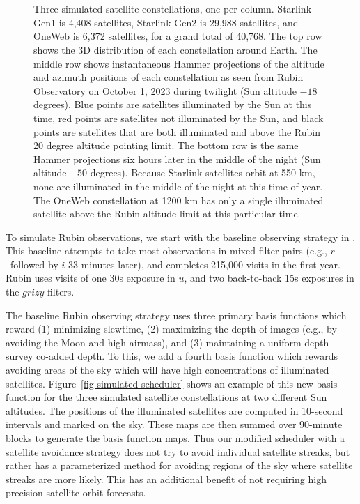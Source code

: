 \documentclass[twocolumn]{aastex631}
\begin{document}
\begin{figure*}[ht!]
\\
\\
\caption{Three simulated satellite constellations, one per column. Starlink Gen1 is 4,408 satellites, Starlink Gen2 is 29,988 satellites, and OneWeb is 6,372 satellites, for a grand total of 40,768. The top row shows the 3D distribution of each constellation around Earth. The middle row shows instantaneous Hammer projections of the altitude and azimuth positions of each constellation as seen from Rubin Observatory on October 1, 2023 during twilight (Sun altitude $-18$ degrees). Blue points are satellites illuminated by the Sun at this time, red points are satellites not illuminated by the Sun, and black points are satellites that are both illuminated and above the Rubin 20 degree altitude pointing limit. The bottom row is the same Hammer projections six hours later in the middle of the night (Sun altitude $-50$ degrees). Because Starlink satellites orbit at 550 km, none are illuminated in the middle of the night at this time of year. The OneWeb constellation at 1200 km has only a single illuminated satellite above the Rubin altitude limit at this particular time.
\vspace{4em}
\label{fig-simulated-constellations}
}
\end{figure*}

To simulate Rubin observations, we start with the baseline observing strategy in \citet{yoachim2022b}. This baseline attempts to take most observations in mixed filter pairs (e.g., $r$\ followed by $i$ 33 minutes later), and completes 215,000 visits in the first year. Rubin uses visits of one 30s exposure in $u$, and two back-to-back 15s exposures in the $grizy$ filters. 

The baseline Rubin observing strategy uses three primary basis functions which reward (1) minimizing slewtime, (2) maximizing the depth of images (e.g., by avoiding the Moon and high airmass), and (3) maintaining a uniform depth survey co-added depth. To this, we add a fourth basis function which rewards avoiding areas of the sky which will have high concentrations of illuminated satellites. Figure~\ref{fig-simulated-scheduler} shows an example of this new basis function for the three simulated satellite constellations at two different Sun altitudes. The positions of the illuminated satellites are computed in 10-second intervals and marked on the sky. These maps are then summed over 90-minute blocks to generate the basis function maps. Thus our modified scheduler with a satellite avoidance strategy does not try to avoid individual satellite streaks, but rather has a parameterized method for avoiding regions of the sky where satellite streaks are more likely. This has an additional benefit of not requiring high precision satellite orbit forecasts.
\end{document}
